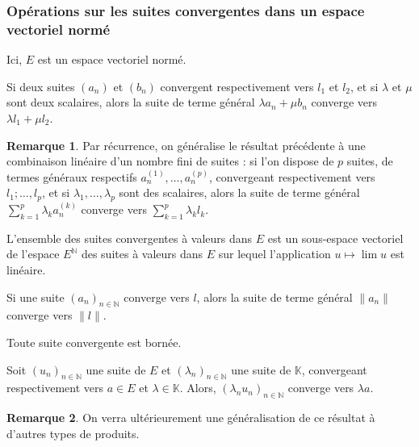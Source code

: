 \documentclass[french]{article}
\newcommand{\N}{\mathbb{N}}
\newcommand{\K}{\mathbb{K}}
\theoremstyle{plain}
\theoremstyle{definition}
\newtheorem*{rmq}{Remarque}
\theoremstyle{remark}
\begin{document}
\subsubsection*{Opérations sur les suites convergentes dans un espace vectoriel normé}

Ici, $E$ est un espace vectoriel normé.

\begin{prop}%
	Si deux suites $(a_n)$ et $(b_n)$ convergent respectivement vers $l_1$ et $l_2$, et si $\lambda$ et $\mu$ sont deux scalaires, alors la suite de terme général $\lambda a_n+\mu b_n$ converge vers $\lambda l_1+\mu l_2$.
\end{prop}

\begin{rmq}
	Par récurrence, on généralise le résultat précédente à une combinaison linéaire d'un nombre fini de suites : si l'on dispose de $p$ suites, de termes généraux respectifs $a_n^{(1)},\ldots,a_n^{(p)}$, convergeant respectivement vers $l_1;\ldots,l_p$, et si $\lambda_1,\ldots,\lambda_p$ sont des scalaires, alors la suite de terme général $\displaystyle\sum_{k=1}^{p}\lambda_ka_n^{(k)}$ converge vers $\displaystyle\sum_{k=1}^{p}\lambda_k l_k$.
\end{rmq}

\begin{cor}%
	L'ensemble des suites convergentes à valeurs dans $E$ est un sous-espace vectoriel de l'espace $E^\N$ des suites à valeurs dans $E$ sur lequel l'application $u\mapsto\lim u$ est linéaire.
\end{cor}

\begin{prop}[]%
	Si une suite $(a_n)_{n\in\N}$ converge vers $l$, alors la suite de terme général $\lVert a_n\rVert$ converge vers $\lVert l\rVert$.
\end{prop}

\begin{cor}%
	Toute suite convergente est bornée.
\end{cor}

\begin{prop}%
	Soit $(u_n)_{n\in\N}$ une suite de $E$ et $(\lambda_n)_{n\in\N}$ une suite de $\K$, convergeant respectivement vers $a\in E$ et $\lambda\in\K$. Alors, $(\lambda_n u_n)_{n\in\N}$ converge vers $\lambda a$.
\end{prop}

\begin{rmq}
	On verra ultérieurement une généralisation de ce résultat à d'autres types de produits.
\end{rmq}
\end{document}
